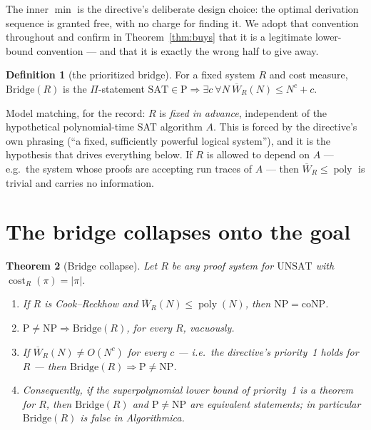 \documentclass[11pt]{article}
\newtheorem{theorem}{Theorem}
\theoremstyle{definition}
\newtheorem{definition}[theorem]{Definition}
\newcommand{\poly}{\operatorname{poly}}
\newcommand{\cost}{\operatorname{cost}}
\newcommand{\UNSAT}{\mathrm{UNSAT}}
\newcommand{\Wbar}{\overline W}
\begin{document}
The inner $\min$ is the directive's deliberate design choice: the optimal
derivation sequence is granted free, with no charge for finding it. We adopt
that convention throughout and confirm in Theorem~\ref{thm:buys} that it is a
legitimate lower-bound convention --- and that it is exactly the wrong half to
give away.

\begin{definition}[the prioritized bridge]
For a fixed system $R$ and cost measure, $\mathrm{Bridge}(R)$ is the
$\Pi$-statement
$\mathrm{SAT}\in\mathrm P\Rightarrow \exists c\ \forall N\ \Wbar_R(N)\le N^c+c$.
\end{definition}

Model matching, for the record: $R$ is \emph{fixed in advance}, independent of
the hypothetical polynomial-time SAT algorithm $A$. This is forced by the
directive's own phrasing (``a fixed, sufficiently powerful logical system''),
and it is the hypothesis that drives everything below. If $R$ is allowed to
depend on $A$ --- e.g.\ the system whose proofs are accepting run traces of $A$
--- then $\Wbar_R\le\poly$ is trivial and carries no information.

\section{The bridge collapses onto the goal}

\begin{theorem}[Bridge collapse]\label{thm:collapse}
Let $R$ be any proof system for $\UNSAT$ with $\cost_R(\pi)=|\pi|$.
\begin{enumerate}
\item[\textup{(a)}] If $R$ is Cook--Reckhow and $\Wbar_R(N)\le\poly(N)$, then
$\mathrm{NP}=\mathrm{coNP}$.
\item[\textup{(b)}] $\mathrm P\neq\mathrm{NP}\Rightarrow\mathrm{Bridge}(R)$,
for every $R$, vacuously.
\item[\textup{(c)}] If $\Wbar_R(N)\neq O(N^{c})$ for every $c$ --- i.e.\ the
directive's priority~1 holds for $R$ --- then
$\mathrm{Bridge}(R)\Rightarrow\mathrm P\neq\mathrm{NP}$.
\item[\textup{(d)}] Consequently, if the superpolynomial lower bound of
priority~1 is a \emph{theorem} for $R$, then $\mathrm{Bridge}(R)$ and
$\mathrm P\neq\mathrm{NP}$ are equivalent statements; in particular
$\mathrm{Bridge}(R)$ is \emph{false} in Algorithmica.
\end{enumerate}
\end{theorem}
\end{document}
